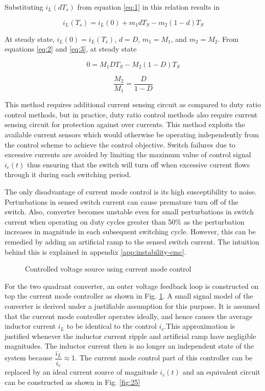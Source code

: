 \documentclass[a4paper]{IEEEtran}
\begin{document}
	Substituting $i_L(dT_s)$ from equation \eqref{eq:1} in this relation results in

	\begin{equation}
		i_L(T_s) = i_L(0)+m_1dT_S - m_2(1-d)T_S
		\label{eq:3}
	\end{equation}

	At steady state, $i_L(0) = i_L(T_s)$, $d=D$, $m_1=M_1$, and $m_2=M_2$. From equations \eqref{eq:2} and \eqref{eq:3}, at steady state

	\begin{equation*}
		0 = M_1DT_S - M_2(1-D)T_S
	\end{equation*}

	\begin{equation}
		\dfrac{M_2}{M_1} = \dfrac{D}{1-D}
		\label{eq:4}
	\end{equation}

	This method requires additional current sensing circuit as compared to duty ratio control methods, but in practice, duty ratio control methods also require current sensing circuit for protection against over currents. This method exploits the available current sensors which would otherwise be operating independently from the control scheme to achieve the control objective. Switch failures due to excessive currents are avoided by limiting the maximum value of control signal $i_c(t)$ thus ensuring that the switch will turn off when excessive current flows through it during each switching period.

	The only disadvantage of current mode control is its high susceptibility to noise. Perturbations in sensed switch current can cause premature turn off of the switch. Also, converter becomes unstable even for small perturbations in switch current when operating on duty cycles greater than 50\% as the perturbation increases in magnitude in each subsequent switching cycle. However, this can be remedied by adding an artificial ramp to the sensed switch current. The intuition behind this is explained in appendix \ref{app:instability-cmc}.

	\begin{figure}
		\centering
		
		\caption{Controlled voltage source using current mode control}
		\label{fig:24}
	\end{figure}

	For the two quadrant converter, an outer voltage feedback loop is constructed on top the current mode controller as shown in Fig. \ref{fig:24}. A small signal model of the converter is derived under a justifiable assumption for this purpose. It is assumed that the current mode controller operates ideally, and hence causes the average inductor current ${i}_L$ to be identical to the control ${i}_c$.This approximation is justified whenever the inductor current ripple and artificial ramp have negligible magnitudes. The inductor current then is no longer an independent state of the system because $\dfrac{i_L}{i_c} \approx 1$. The current mode control part of this controller can be replaced by an ideal current source of magnitude $i_c(t)$ and an equivalent circuit can be constructed as shown in Fig. \ref{fig:25}
\end{document}
